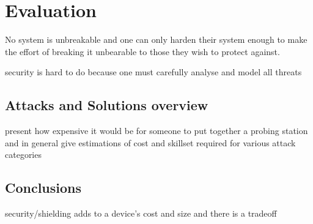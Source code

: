 \section{Evaluation}
\label{sec:conclusion}
No system is unbreakable and one can only harden their system enough to make the effort of breaking it unbearable to those they wish to protect against\citep{anderson:cautionary_note}\cite{sergei:thesis}.

security is hard to do because one must carefully analyse and model all threats \citep{kocher:DPA}
	\subsection{Attacks and Solutions overview}
	present how expensive it would be for someone to put together a probing station and in general give estimations of cost  and skillset required for various attack categories
	\subsection{Conclusions}

security/shielding adds to a device's cost and size \citep{kocher:DPA} and there is a tradeoff \citep{sergei:thesis}